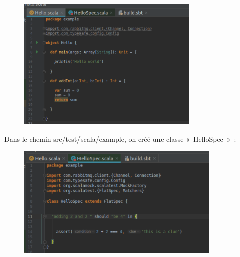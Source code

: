 \documentclass[12pt]{article}
\begin{document}

\begin{figure}[H]
	\begin{Center}
		\includegraphics[width=3.42in,height=2.49in]{./media/image15.png}
	\end{Center}
\end{figure}



\par

Dans le chemin src/test/scala/example, on créé une classe « HelloSpec » :\par




\begin{figure}[H]
	\begin{Center}
		\includegraphics[width=3.83in,height=2.11in]{./media/image16.png}
	\end{Center}
\end{figure}



\par
\end{document}
